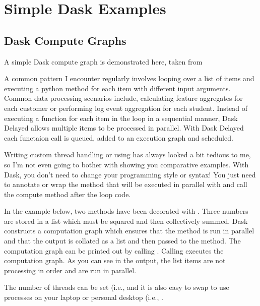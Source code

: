 \chapter{Simple Dask Examples}
\label{chap:SimpleDaskExamples}

\section{Dask Compute Graphs}
\label{sec:DaskComputeGraphs}

A simple Dask compute graph is demonstrated here, taken from 

A common pattern I encounter regularly involves looping over a list of items and executing a python method for each item with different input arguments. Common data processing scenarios include, calculating feature aggregates for each customer or performing log event aggregation for each student. Instead of executing a function for each item in the loop in a sequential manner, Dask Delayed allows multiple items to be processed in parallel. With Dask Delayed each functaion call is queued, added to an execution graph and scheduled.

Writing custom thread handling or using  has always looked a bit tedious to me, so I'm not even going to bother with showing you comparative examples. With Dask, you don't need to change your programming style or syntax! You just need to annotate or wrap the method that will be executed in parallel with  and call the compute method after the loop code.

In the example below, two methods have been decorated with . Three numbers are stored in a list which must be squared and then collectively summed. Dask constructs a computation graph which ensures that the  method is run in parallel and that the output is collated as a list and then passed to the  method. The computation graph can be printed out by calling . Calling  executes the computation graph. As you can see in the output, the  list items are not processing in order and are run in parallel.

The number of threads can be set (i.e.,  and it is also easy to swap to use processes on your laptop or personal desktop (i.e., .

